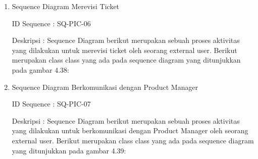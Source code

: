 \documentclass[12pt]{article}
\begin{document}
\begin{enumerate}[label=\textbf{4.\arabic*.}]
\begin{enumerate}[label=\textbf{4.1.\arabic*.}, wide, labelwidth=!, labelindent=0pt]
\begin{enumerate}[label=\textbf{4.1.7.\arabic*.}, wide, labelwidth=!, labelindent=0pt]
\begin{enumerate}[label=\arabic*.]
                \item Sequence Diagram Merevisi Ticket
                
                \noindent ID Sequence	: SQ-PIC-06
                
                \noindent Deskripsi	: Sequence Diagram berikut merupakan sebuah proses aktivitas yang dilakukan untuk merevisi ticket oleh seorang external user. Berikut merupakan class class yang ada pada sequence diagram yang ditunjukkan pada gambar 4.38:
                
                
                \item Sequence Diagram Berkomunikasi dengan Product Manager
                
                \noindent ID Sequence	: SQ-PIC-07
                
                \noindent Deskripsi	: Sequence Diagram berikut merupakan sebuah proses aktivitas yang dilakukan untuk berkomunikasi dengan Product Manager oleh seorang external user. Berikut merupakan class class yang ada pada sequence diagram yang ditunjukkan pada gambar 4.39:
                




                
                

\end{enumerate}
\end{enumerate}
\end{enumerate}
\end{enumerate}
\end{document}
